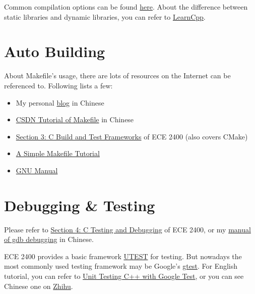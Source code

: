 \documentclass[english]{../TexTemplate/thesis}
\begin{document}
Common compilation options can be found \href{https://caiorss.github.io/C-Cpp-Notes/compiler-flags-options.html}{here}.
About the difference between static libraries and dynamic libraries, you can refer to \href{https://www.learncpp.com/cpp-tutorial/introduction-to-the-compiler-linker-and-libraries/}{LearnCpp}.

\section{Auto Building}
About Makefile's usage, there are lots of resources on the Internet can be referenced to.
Following lists a few:
\begin{itemize}
	\item My personal \href{https://chhzh123.github.io/2019-02-24-makefile/}{blog} in Chinese
	\item \href{https://blog.csdn.net/weixin_38391755/article/details/80380786}{CSDN Tutorial of Makefile} in Chinese
	\item \href{https://cornell-ece2400.github.io/ece2400-docs/ece2400-sec3-c-build-test/}{Section 3: C Build and Test Frameworks} of ECE 2400 (also covers CMake)
	\item \href{http://www.cs.colby.edu/maxwell/courses/tutorials/maketutor/}{A Simple Makefile Tutorial}
	\item \href{https://www.gnu.org/software/make/manual/make.html#Reference}{GNU Manual}
\end{itemize}

\section{Debugging \& Testing}
Please refer to \href{https://cornell-ece2400.github.io/ece2400-docs/ece2400-sec4-c-test-debug/}{Section 4: C Testing and Debugging} of ECE 2400, or my \href{https://chhzh123.github.io/2019-03-16-gdb/}{manual of gdb debugging} in Chinese.

ECE 2400 provides a basic framework \href{https://cornell-ece2400.github.io/ece2400-docs/ece2400-sec4-c-test-debug/}{UTEST} for testing.
But nowadays the most commonly used testing framework may be Google's \href{https://github.com/google/googletest}{gtest}.
For English tutorial, you can refer to \href{https://blog.jetbrains.com/rscpp/unit-testing-google-test/}{Unit Testing C++ with Google Test}, or you can see Chinese one on \href{https://www.zhihu.com/question/27313846/answer/130954707}{Zhihu}.
\end{document}
